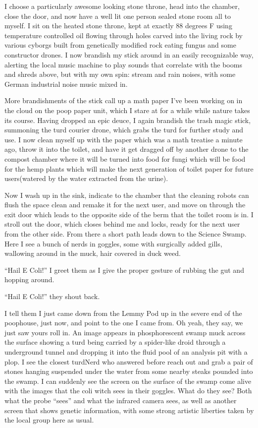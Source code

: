 I choose a particularly awesome looking stone throne, head into the
chamber, close the door, and now have a well lit one person sealed stone
room all to myself. I sit on the heated stone throne, kept at exactly 88
degrees F using temperature controlled oil flowing through holes carved
into the living rock by various cyborgs built from genetically modified
rock eating fungus and some constructor drones. I now brandish my stick
around in an easily recognizable way, alerting the local music machine
to play sounds that correlate with the booms and shreds above, but with
my own spin: stream and rain noises, with some German industrial noise
music mixed in.

More brandishments of the stick call up a math paper I've been working
on in the cloud on the poop paper unit, which I stare at for a while
while nature takes its course. Having dropped an epic deuce, I again
brandish the trash magic stick, summoning the turd courier drone, which
grabs the turd for further study and use. I now clean myself up with the
paper which was a math treatise a minute ago, throw it into the toilet,
and have it get dragged off by another drone to the compost chamber
where it will be turned into food for fungi which will be food for the
hemp plants which will make the next generation of toilet paper for
future users(watered by the water extracted from the urine).

Now I wash up in the sink, indicate to the chamber that the cleaning
robots can flush the space clean and remake it for the next user, and
move on through the exit door which leads to the opposite side of the
berm that the toilet room is in. I stroll out the door, which closes
behind me and locks, ready for the next user from the other side. From
there a short path leads down to the Science Swamp. Here I see a bunch
of nerds in goggles, some with surgically added gills, wallowing around
in the muck, hair covered in duck weed.

``Hail E Coli!'' I greet them as I give the proper gesture of rubbing
the gut and hopping around.

``Hail E Coli!'' they shout back.

I tell them I just came down from the Lemmy Pod up in the severe end of
the poophouse, just now, and point to the one I came from. Oh yeah, they
say, we just saw yours roll in. An image appears in phosphorescent swamp
muck across the surface showing a turd being carried by a spider-like
droid through a underground tunnel and dropping it into the fluid pool
of an analysis pit with a plop. I see the closest turdNerd who answered
before reach out and grab a pair of stones hanging suspended under the
water from some nearby steaks pounded into the swamp. I can suddenly see
the screen on the surface of the swamp come alive with the images that
the coli witch sees in their goggles. What do they see? Both what the
probe ``sees'' and what the infrared camera sees, as well as another
screen that shows genetic information, with some strong artistic
liberties taken by the local group here as usual.

